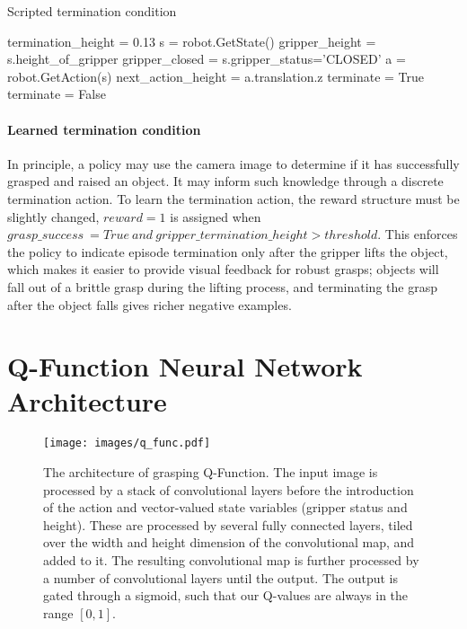 \documentclass{article}
\begin{document}
\begin{algorithm}[h]{\small
	\caption{Scripted termination condition}
	\label{alg:scripted_termination_condition}
	\begin{algorithmic}[1]
	    \STATE termination\_height = 0.13
		\STATE s = robot.GetState()
		\STATE gripper\_height = s.height\_of\_gripper
		\STATE gripper\_closed = s.gripper\_status='CLOSED'
		\STATE a = robot.GetAction(s)
		\STATE next\_action\_height = a.translation.z
			\STATE terminate = True
		\ELSE
			\STATE terminate = False
		\ENDIF
	\end{algorithmic}
}
\end{algorithm}\paragraph{Learned termination condition}\label{sec:grasp_success}
In principle, a policy may use the camera image to determine if it has successfully grasped and raised an object. It may inform such knowledge through a discrete termination action. To learn the termination action, the reward structure must be slightly changed, \(reward=1\) is assigned when \(grasp\_success\ = True\ and\ gripper\_termination\_height>threshold\). This enforces the policy to indicate episode termination only after the gripper lifts the object, which makes it easier to provide visual feedback for robust grasps; objects will fall out of a brittle grasp during the lifting process, and terminating the grasp after the object falls gives richer negative examples.



\section{Q-Function Neural Network Architecture}
\label{sec:appendix_arch}
\begin{figure*}
\begin{center}
 \texttt{[image: images/q\_func.pdf]}
\end{center}
   \caption{The architecture of grasping Q-Function. The input image is processed by a stack of convolutional layers before the introduction of the action and vector-valued state variables (gripper status and height). These are processed by several fully connected layers, tiled over the width and height dimension of the convolutional map, and added to it. The resulting convolutional map is further processed by a number of convolutional layers until the output. The output is gated through a sigmoid, such that our Q-values are always in the range $[0, 1]$.}
\label{fig:q-network}
\vspace{-0.2in}
\end{figure*}
\end{document}
